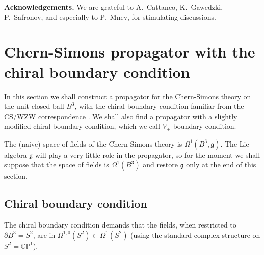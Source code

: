 \documentclass[a4paper]{amsart}
\theoremstyle{plain}
\theoremstyle{definition}
\newcommand{\g}{\mathfrak{g}}
\newcommand{\CP}{\mathbb{CP}^1}
\newcommand{\cf}{\mathsf{Conf}}
\begin{document}
\noindent\textbf{Acknowledgements.} We are grateful to A.\ Cattaneo, K.\ Gawedzki, P.\ Safronov, and especially to P.\ Mnev, for stimulating discussions.

	
	

\section{Chern-Simons propagator with the chiral boundary condition}

In this section we shall construct a propagator for the Chern-Simons theory on the unit closed ball $B^3$, with the chiral boundary condition familiar from the CS/WZW correspondence \cite{W}. We shall also find a propagator with a slightly modified chiral boundary condition, which we call $V_+$-boundary condition.

The (naive) space of fields of the Chern-Simons theory is $\Omega^1(B^3,\g)$. The Lie algebra $\g$ will play a very little role in the propagator, so for the moment we shall suppose that the space of fields is $\Omega^1(B^3)$ and restore $\g$ only at the  end of this section.

\subsection{Chiral boundary condition}
The chiral boundary condition demands that the fields, when restricted to $\partial B^3 = S^2$, are in $\Omega^{1,0}(S^2)\subset\Omega^1(S^2)$ (using the standard complex structure on $S^2=\CP$). 
\end{document}
